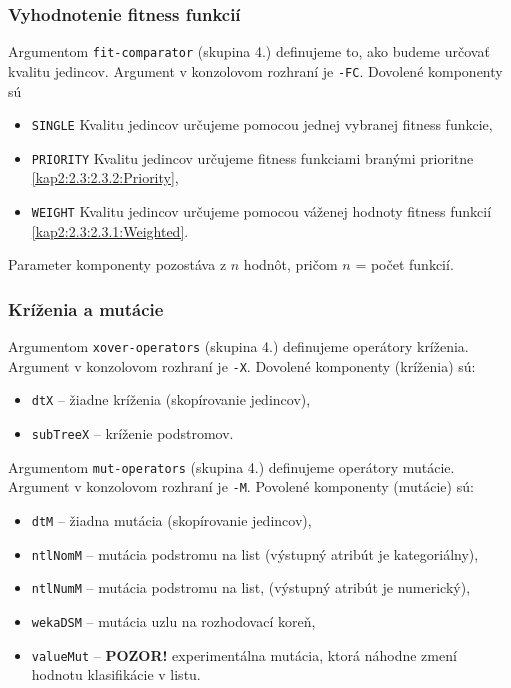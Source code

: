 \subsubsection*{Vyhodnotenie fitness funkcií}
Argumentom \verb|fit-comparator| (skupina 4.) definujeme to, ako budeme určovať kvalitu jedincov. Argument v konzolovom rozhraní je \verb|-FC|.
Dovolené komponenty sú 
\begin{itemize}
\item \verb|SINGLE| Kvalitu jedincov určujeme pomocou jednej vybranej fitness funkcie,
\item \verb|PRIORITY| Kvalitu jedincov určujeme fitness funkciami branými prioritne \ref{kap2:2.3:2.3.2:Priority},
\item \verb|WEIGHT| Kvalitu jedincov určujeme pomocou váženej hodnoty fitness funkcií \ref{kap2:2.3:2.3.1:Weighted}.
\end{itemize}

Parameter komponenty pozostáva z $n$ hodnôt, pričom $n$ = počet funkcií.

\subsubsection*{Kríženia a mutácie}
Argumentom \verb|xover-operators| (skupina 4.) definujeme operátory kríženia. Argument v konzolovom rozhraní je \verb|-X|.
Dovolené komponenty (kríženia) sú: 
\begin{itemize}
\item \verb|dtX| -- žiadne kríženia (skopírovanie jedincov),
\item \verb|subTreeX|  -- kríženie podstromov.
\end{itemize}

Argumentom \verb|mut-operators| (skupina 4.) definujeme operátory mutácie. Argument v konzolovom rozhraní je \verb|-M|.
Povolené komponenty (mutácie) sú:
\begin{itemize}
\item \verb|dtM| -- žiadna mutácia (skopírovanie jedincov),
\item \verb|ntlNomM|  -- mutácia podstromu na list (výstupný atribút je kategoriálny),
\item \verb|ntlNumM|  -- mutácia podstromu na list, (výstupný atribút je numerický),
\item \verb|wekaDSM|  -- mutácia uzlu na rozhodovací koreň,
\item \verb|valueMut| -- \textbf{POZOR!} experimentálna mutácia, ktorá náhodne zmení hodnotu klasifikácie v listu.
\end{itemize}

